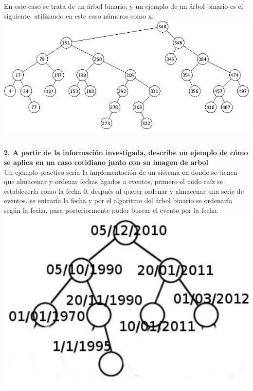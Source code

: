 \documentclass[spanish,12pt,letterpapper]{article}
\begin{document}
	En este caso se trata de un árbol binario, y un ejemplo de un árbol binario es el siguiente, utilizando en este caso números como x:\\
	
	\includegraphics[width=1\textwidth]{./arbolbinario}~\\[1cm]
	\pagebreak
	
	
	\textbf{2. A partir de la información investigada, describe un ejemplo de cómo se aplica en un caso cotidiano junto con su imagen de arbol\\}
	Un ejemplo practico seria la implementación de un sistema en donde se tienen que almacenar y ordenar fechas ligados a eventos, primero el nodo raíz se establecería como la fecha 0, después al querer ordenar y almacenar una serie de eventos, se entraría la fecha y por el algoritmo del árbol binario se ordenaría según la fecha, para posteriormente poder buscar el evento por la fecha.\\
	
	\includegraphics[width=1\textwidth]{./abinariomod}~\\[1cm]
	\pagebreak
		
\end{document}
